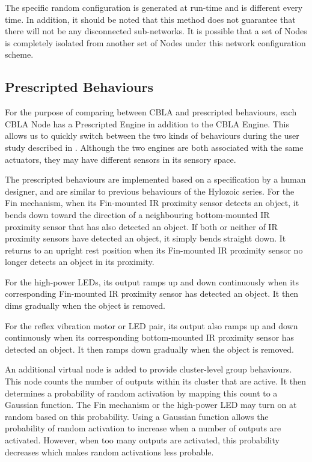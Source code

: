 The specific random configuration is generated at run-time and is different every time. In addition, it should be noted that this method does not guarantee that there will not be any disconnected sub-networks. It is possible that a set of Nodes is completely isolated from another set of Nodes under this network configuration scheme.

\subsection{Prescripted Behaviours}\label{sec:prescripted-behaviours}

For the purpose of comparing between CBLA and prescripted behaviours, each CBLA Node has a Prescripted Engine in addition to the CBLA Engine. This allows us to quickly switch between the two kinds of behaviours during the user study described in . Although the two engines are both associated with the same actuators, they may have different sensors in its sensory space. 

The prescripted behaviours are implemented based on a specification by a human designer, and are similar to previous behaviours of the Hylozoic series\cite{Gorbet2015}. For the Fin mechanism, when its Fin-mounted IR proximity sensor detects an object, it bends down toward the direction of a neighbouring bottom-mounted IR proximity sensor that has also detected an object. If both or neither of IR proximity sensors have detected an object, it simply bends straight down. It returns to an upright rest position when its Fin-mounted IR proximity sensor no longer detects an object in its proximity.

For the high-power LEDs, its output ramps up and down continuously when its corresponding Fin-mounted IR proximity sensor has detected an object. It then dims gradually when the object is removed.

For the reflex vibration motor or LED pair, its output also ramps up and down continuously when its corresponding bottom-mounted IR proximity sensor has detected an object. It then ramps down gradually when the object is removed.

An additional virtual node is added to provide cluster-level group behaviours. This node counts the number of outputs within its cluster that are active. It then determines a probability of random activation by mapping this count to a Gaussian function. The Fin mechanism or the high-power LED may turn on at random based on this probability. Using a Gaussian function allows the probability of random activation to increase when a number of outputs are activated. However, when too many outputs are activated, this probability decreases which makes random activations less probable. 


